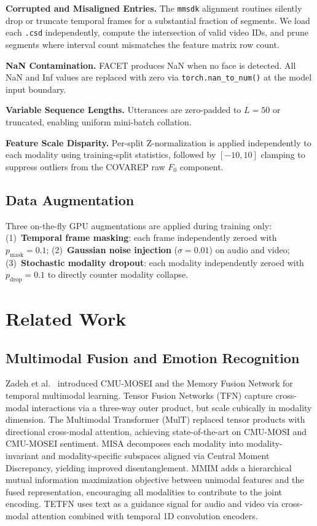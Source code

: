 \documentclass[conference]{IEEEtran}
\begin{document}
\textbf{Corrupted and Misaligned Entries.}
The \texttt{mmsdk} alignment routines silently drop or truncate temporal frames
for a substantial fraction of segments.  We load each \texttt{.csd}
independently, compute the intersection of valid video IDs, and prune segments
where interval count mismatches the feature matrix row count.

\textbf{NaN Contamination.}
FACET produces NaN when no face is detected.  All NaN and Inf values are
replaced with zero via \texttt{torch.nan\_to\_num()} at the model input boundary.

\textbf{Variable Sequence Lengths.}
Utterances are zero-padded to $L=50$ or truncated, enabling uniform mini-batch
collation.

\textbf{Feature Scale Disparity.}
Per-split Z-normalization is applied independently to each modality using
training-split statistics, followed by $[-10, 10]$ clamping to suppress
outliers from the COVAREP raw $F_0$ component.

\label{sec:preprocessing}

\subsection{Data Augmentation}
Three on-the-fly GPU augmentations are applied during training only:
(1)~\textbf{Temporal frame masking}: each frame independently zeroed with
$p_{\mathrm{mask}}=0.1$; (2)~\textbf{Gaussian noise injection}
($\sigma=0.01$) on audio and video; (3)~\textbf{Stochastic modality dropout}:
each modality independently zeroed with $p_{\mathrm{drop}}=0.1$ to directly
counter modality collapse.

\section{Related Work}

\subsection{Multimodal Fusion and Emotion Recognition}
Zadeh et al.\ \cite{zadeh2018mosei} introduced CMU-MOSEI and the Memory Fusion
Network for temporal multimodal learning.  Tensor Fusion Networks (TFN)
\cite{zadeh2017tfn} capture cross-modal interactions via a three-way outer
product, but scale cubically in modality dimension.  The Multimodal Transformer
(MulT) \cite{tsai2019mult} replaced tensor products with directional cross-modal
attention, achieving state-of-the-art on CMU-MOSI and CMU-MOSEI sentiment.
MISA \cite{hazarika2020misa} decomposes each modality into modality-invariant
and modality-specific subspaces aligned via Central Moment Discrepancy, yielding
improved disentanglement.  MMIM \cite{han2021mmim} adds a hierarchical mutual
information maximization objective between unimodal features and the fused
representation, encouraging all modalities to contribute to the joint encoding.
TETFN \cite{yang2022tetfn} uses text as a guidance signal for audio and video
via cross-modal attention combined with temporal 1D convolution encoders.
\end{document}

